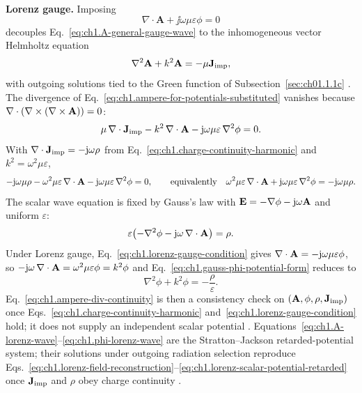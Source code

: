 \textbf{Lorenz gauge.} Imposing
\begin{equation}
\label{eq:ch1.lorenz-gauge-condition}
\nabla\cdot\mathbf{A}+\jj\omega\mu\varepsilon\phi=0
\end{equation}
decouples Eq.~\eqref{eq:ch1.A-general-gauge-wave} to the inhomogeneous vector Helmholtz equation
\begin{equation}
\label{eq:ch1.A-lorenz-wave}
\nabla^2\mathbf{A}+k^2\mathbf{A}=-\mu\mathbf{J}_{\mathrm{imp}},
\end{equation}
with outgoing solutions tied to the Green function of Subsection~\ref{sec:ch01.1.1c} \cite{stratton1941,jackson1999}. The divergence of Eq.~\eqref{eq:ch1.ampere-for-potentials-substituted} vanishes because $\nabla\cdot(\nabla\times(\nabla\times\mathbf{A}))=0$:
\begin{equation}
\label{eq:ch1.ampere-div-potentials}
\mu\,\nabla\cdot\mathbf{J}_{\mathrm{imp}}-k^2\,\nabla\cdot\mathbf{A}-\mathrm{j}\omega\mu\varepsilon\,\nabla^2\phi=0.
\end{equation}
With $\nabla\cdot\mathbf{J}_{\mathrm{imp}}=-\mathrm{j}\omega\rho$ from Eq.~\eqref{eq:ch1.charge-continuity-harmonic} and $k^2=\omega^2\mu\varepsilon$,
\begin{equation}
\label{eq:ch1.ampere-div-continuity}
-\mathrm{j}\omega\mu\rho-\omega^2\mu\varepsilon\,\nabla\cdot\mathbf{A}-\mathrm{j}\omega\mu\varepsilon\,\nabla^2\phi=0,
\qquad\text{equivalently}\quad
\omega^2\mu\varepsilon\,\nabla\cdot\mathbf{A}+\mathrm{j}\omega\mu\varepsilon\,\nabla^2\phi=-\mathrm{j}\omega\mu\rho.
\end{equation}
The scalar wave equation is fixed by Gauss's law with $\mathbf{E}=-\nabla\phi-\mathrm{j}\omega\mathbf{A}$ and uniform $\varepsilon$:
\begin{equation}
\label{eq:ch1.gauss-phi-potential-form}
\varepsilon\bigl(-\nabla^2\phi-\mathrm{j}\omega\,\nabla\cdot\mathbf{A}\bigr)=\rho.
\end{equation}
Under Lorenz gauge, Eq.~\eqref{eq:ch1.lorenz-gauge-condition} gives $\nabla\cdot\mathbf{A}=-\mathrm{j}\omega\mu\varepsilon\phi$, so $-\mathrm{j}\omega\,\nabla\cdot\mathbf{A}=\omega^2\mu\varepsilon\phi=k^2\phi$ and Eq.~\eqref{eq:ch1.gauss-phi-potential-form} reduces to
\begin{equation}
\label{eq:ch1.phi-lorenz-wave}
\nabla^2\phi+k^2\phi=-\frac{\rho}{\varepsilon}.
\end{equation}
Eq.~\eqref{eq:ch1.ampere-div-continuity} is then a consistency check on $(\mathbf{A},\phi,\rho,\mathbf{J}_{\mathrm{imp}})$ once Eqs.~\eqref{eq:ch1.charge-continuity-harmonic} and~\eqref{eq:ch1.lorenz-gauge-condition} hold; it does not supply an independent scalar potential \cite{stratton1941,jackson1999}.
Equations~\eqref{eq:ch1.A-lorenz-wave}--\eqref{eq:ch1.phi-lorenz-wave} are the Stratton--Jackson retarded-potential system; their solutions under outgoing radiation selection reproduce Eqs.~\eqref{eq:ch1.lorenz-field-reconstruction}--\eqref{eq:ch1.lorenz-scalar-potential-retarded} once $\mathbf{J}_{\mathrm{imp}}$ and $\rho$ obey charge continuity \cite{stratton1941,jackson1999}.

